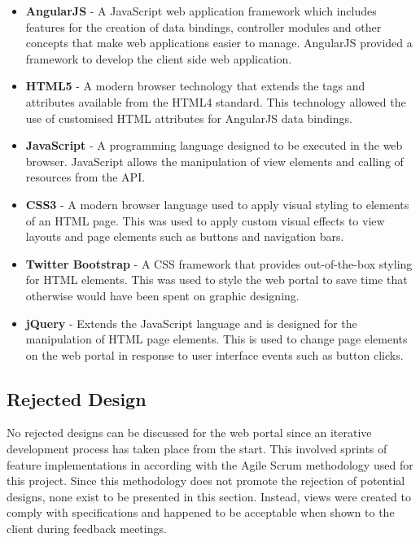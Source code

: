 \documentclass[11pt,a4paper]{report}
\begin{document}
\begin{itemize}

\item \textbf{AngularJS} - A JavaScript web application framework which includes features for the creation of data bindings, controller modules and other concepts that make web applications easier to manage. AngularJS provided a framework to develop the client side web application.

\item \textbf{HTML5} - A modern browser technology that extends the tags and attributes available from the HTML4 standard. This technology allowed the use of customised HTML attributes for AngularJS data bindings.

\item \textbf{JavaScript} - A programming language designed to be executed in the web browser. JavaScript allows the manipulation of view elements and calling of resources from the API.

\item \textbf{CSS3} - A modern browser language used to apply visual styling to elements of an HTML page. This was used to apply custom visual effects to view layouts and page elements such as buttons and navigation bars.

\item \textbf{Twitter Bootstrap} - A CSS framework that provides out-of-the-box styling for HTML elements. This was used to style the web portal to save time that otherwise would have been spent on graphic designing.

\item \textbf{jQuery} - Extends the JavaScript language and is designed for the manipulation of HTML page elements. This is used to change page elements on the web portal in response to user interface events such as button clicks.

\end{itemize}

\subsection{Rejected Design}
\label{sec:portal-rejected-design}

No rejected designs can be discussed for the web portal since an iterative development process has taken place from the start. This involved sprints of feature implementations in according with the Agile Scrum methodology used for this project. Since this methodology does not promote the rejection of potential designs, none exist to be presented in this section. Instead, views were created to comply with specifications and happened to be acceptable when shown to the client during feedback meetings.
\end{document}
